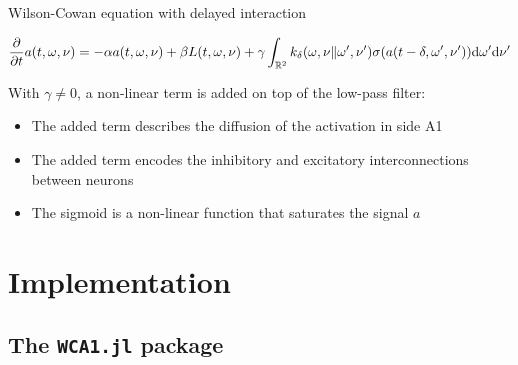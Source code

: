 \documentclass[10pt,american,ignorenonframetext,aspectratio=1610]{beamer}
\providecommand{\tightlist}{%
  \setlength{\itemsep}{0pt}\setlength{\parskip}{0pt}}
\theoremstyle{remark}
\begin{document}
\begin{frame}{Wilson-Cowan equation with delayed interaction}
\protect\hypertarget{wilson-cowan-equation-with-delayed-interaction}{}

\[\frac{\partial}{\partial t} a(t,\omega,\nu) = -\alpha a(t,\omega,\nu) + \beta L(t,\omega,\nu)
+ \gamma\int_{\mathbb{R}^2} k_\delta(\omega,\nu\Vert\omega',\nu') \sigma(a(t-\delta,\omega',\nu')) \mathrm{d}\omega'\mathrm{d}\nu'\]

With \(\gamma\neq0\), a non-linear term is added on top of the low-pass
filter:

\begin{itemize}
\tightlist
\item
  The added term describes the diffusion of the activation in side A1
\item
  The added term encodes the inhibitory and excitatory interconnections
  between neurons
\item
  The sigmoid is a non-linear function that saturates the signal \(a\)
\end{itemize}

\end{frame}

\hypertarget{implementation}{%
\section{Implementation}\label{implementation}}

\hypertarget{the-wca1.jl-package}{%
\subsection{\texorpdfstring{The \texttt{WCA1.jl}
package}{The WCA1.jl package}}\label{the-wca1.jl-package}}
\end{document}
